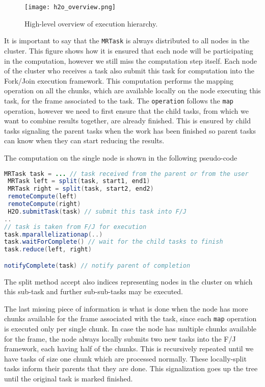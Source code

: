 	\begin{figure}
		\centering
		\texttt{[image: h2o\_overview.png]}
		\caption{High-level overview of execution hierarchy.}
		\label{fig:h2o_overview}
	\end{figure}


It is important to say that the \texttt{MRTask} is always distributed to all nodes in the cluster. This figure shows how it is ensured that each node will be participating in the computation, however we still miss the computation step itself. Each node of the cluster who receives a task also submit this task for computation into the Fork/Join execution framework. This computation performs the mapping operation on all the chunks, which are available locally on the node executing this task, for the frame associated to the task. The \texttt{operation} follows the \texttt{map} operation, however we need to first ensure that the child tasks, from which we want to combine results together, are already finished. This is ensured by child tasks signaling the parent tasks when the work has been finished so parent tasks can know when they can start reducing the results.

The computation on the single node is shown in the following pseudo-code
\begin{lstlisting}[language=Java]
 MRTask task = ... // task received from the parent or from the user
 MRTask left = split(task, start1, end1)
 MRTask right = split(task, start2, end2)
 remoteCompute(left)
 remoteCompute(right)
 H2O.submitTask(task) // submit this task into F/J
..
// task is taken from F/J for execution
task.mparallelizationap(..)
task.waitForComplete() // wait for the child tasks to finish
task.reduce(left, right)

notifyComplete(task) // notify parent of completion
\end{lstlisting}
The split method accept also indices representing nodes in the cluster on which this sub-task and further sub-sub-tasks may be executed.

The last missing piece of information is what is done when the node has more chunks available for the frame associated with the task, since each \texttt{map} operation is executed only per single chunk. In case the node has multiple chunks available for the frame, the node always locally submits two new tasks into the F/J framework, each having half of the chunks. This is recursively repeated until we have tasks of size one chunk which are processed normally. These locally-split tasks inform their parents that they are done. This signalization goes up the tree until the original task is marked finished.

